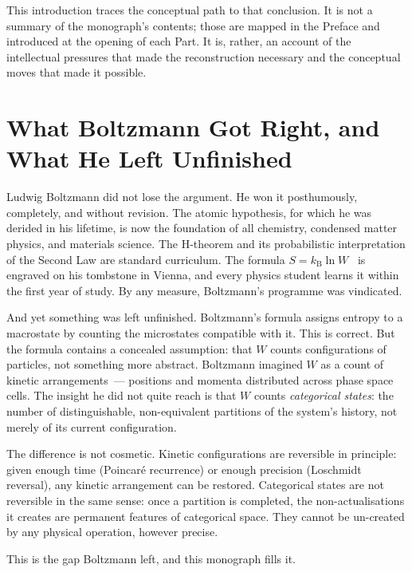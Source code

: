 This introduction traces the conceptual path to that conclusion. It is not a summary
of the monograph's contents; those are mapped in the Preface and introduced at the
opening of each Part. It is, rather, an account of the intellectual pressures that
made the reconstruction necessary and the conceptual moves that made it possible.


\section*{What Boltzmann Got Right, and What He Left Unfinished}

Ludwig Boltzmann did not lose the argument. He won it posthumously, completely, and
without revision. The atomic hypothesis, for which he was derided in his lifetime,
is now the foundation of all chemistry, condensed matter physics, and materials
science. The H-theorem and its probabilistic interpretation of the Second Law are
standard curriculum. The formula $S = k_{\mathrm{B}} \ln W$~\cite{boltzmann1877} is
engraved on his tombstone in Vienna, and every physics student learns it within the
first year of study. By any measure, Boltzmann's programme was vindicated.

And yet something was left unfinished. Boltzmann's formula assigns entropy to a
macrostate by counting the microstates compatible with it. This is correct.
But the formula contains a concealed assumption: that $W$ counts configurations
of particles, not something more abstract. Boltzmann imagined $W$ as a count of
kinetic arrangements~--- positions and momenta distributed across phase space cells.
The insight he did not quite reach is that $W$ counts \emph{categorical states}: the
number of distinguishable, non-equivalent partitions of the system's history, not
merely of its current configuration.

The difference is not cosmetic. Kinetic configurations are reversible in principle:
given enough time (Poincaré recurrence) or enough precision (Loschmidt reversal),
any kinetic arrangement can be restored. Categorical states are not reversible
in the same sense: once a partition is completed, the non-actualisations it creates
are permanent features of categorical space. They cannot be un-created by any
physical operation, however precise.

This is the gap Boltzmann left, and this monograph fills it.



